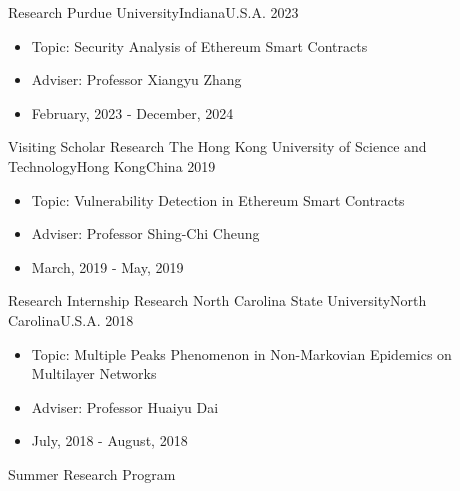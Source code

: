 %
%
%
\begin{experiences}
	\experience
	{Research} {Purdue University}{Indiana}{U.S.A.}
	{2023}    {
		\begin{itemize}
			\item Topic: Security Analysis of Ethereum Smart Contracts
			\item Adviser: Professor Xiangyu Zhang
			\item February, 2023 - December, 2024
		\end{itemize}
	}
	{Visiting Scholar}
	\emptySeparator
	\experience
	{Research} {The Hong Kong University of Science and Technology}{Hong Kong}{China}
	{2019}    {
		\begin{itemize}
			\item Topic: Vulnerability Detection in Ethereum Smart Contracts
			\item Adviser: Professor Shing-Chi Cheung
			\item March, 2019 - May, 2019
		\end{itemize}
	}
	{Research Internship}
	\emptySeparator
	\experience
	{Research}   {North Carolina State University}{North Carolina}{U.S.A.}
	{2018} {
		\begin{itemize}
			\item Topic: Multiple Peaks Phenomenon in Non-Markovian Epidemics on Multilayer Networks
			\item Adviser: Professor Huaiyu Dai
			\item July, 2018 - August, 2018
		\end{itemize}
	}
	{Summer Research Program}
\end{experiences}
